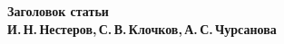 \documentclass[10pt,a4paper,oneside]{article}
\begin{document}
 
\begin{center}
    \textbf{\LARGE Заголовок статьи} \\[1em]
    \textbf{И.\,Н.\,Нестеров,\,С.\,В.\,Клочков,\,А.\,С.\,Чурсанова} \\[2em]
\end{center}





  
 
\end{document}
